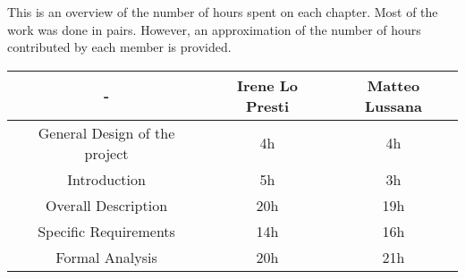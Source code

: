 This is an overview of the number of hours spent on each chapter. Most of the work was done in pairs. However, an approximation of the number of hours contributed by each member is provided.
\begin{table}[]
    \centering
    \begin{tabular}{|c|c|c|}
        \hline
        - & \textbf{Irene Lo Presti} & \textbf{Matteo Lussana} \\\hline
        General Design of the project& 4h & 4h \\\hline
        Introduction & 5h & 3h \\\hline
        Overall Description & 20h & 19h \\\hline
        Specific Requirements & 14h & 16h \\\hline
        Formal Analysis& 20h & 21h \\\hline
    \end{tabular}
\end{table}